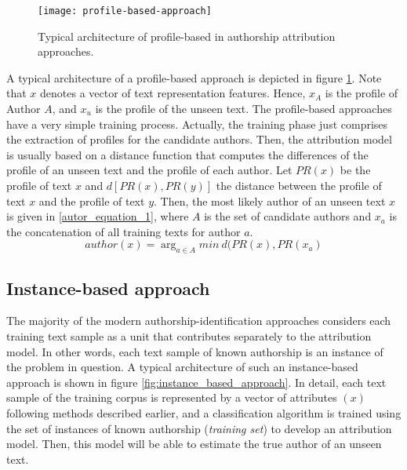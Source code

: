 \begin{figure}[ht]
	\centering
	\texttt{[image: profile-based-approach]}
	\caption[Profile-based approach training schema]{Typical architecture of profile-based in authorship attribution approaches. \cite{stamatatos2009survey}}
	\label{fig:profile_based_approach}
\end{figure}

A typical architecture of a profile-based approach is depicted in figure  \ref{fig:profile_based_approach}. Note that $x$ denotes a vector of text representation
features. Hence, $x_A$ is the profile of Author $A$, and $x_u$ is the
profile of the unseen text.
The profile-based approaches have a very simple training process. Actually, the training phase just comprises the extraction of profiles for the candidate authors. Then, the attribution model is usually based on a distance function that computes the differences of the profile of an unseen text and the profile of each author. Let $PR(x)$ be the profile of text $x$ and $d[PR(x),PR(y)]$ the distance between the profile of text $x$ and the profile of text $y$. Then, the most likely author of an unseen text $x$ is given in \ref{autor_equation_1}, where $A$ is the set of candidate authors and $x_a$ is the concatenation of all training texts for author $a$.
\begin{equation}\label{autor_equation_1}
author(x) = \arg_{a \in A} min\ d(PR(x), PR(x_a)
\end{equation}


\subsection{Instance-based approach}

The majority of the modern authorship-identification approaches considers each training text sample as a unit that contributes separately to the attribution model. In other words, each text sample of known authorship is an instance of the problem in question. A typical architecture of such an instance-based approach is shown in figure  \ref{fig:instance_based_approach}. In detail, each text sample of the training corpus is represented by a vector of attributes $(x)$ following methods described earlier, and a
classification algorithm is trained using the set of instances of known authorship (\textit{training set}) to develop an attribution model. Then, this model will be able to estimate the true author of an unseen text.

